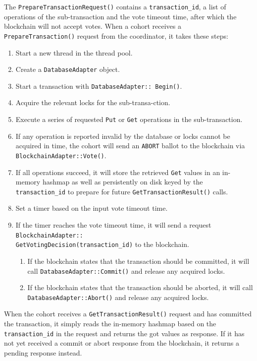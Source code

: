 \documentclass[11pt,sigplan,screen,nonacm]{acmart}
\begin{document}
The \texttt{PrepareTransactionRequest()} contains a \texttt{transaction\_id}, a list of operations of the sub-transaction and the vote timeout time, after which the blockchain will not accept votes. When a cohort receives a \texttt{PrepareTransaction()} request from the coordinator, it takes these steps: 
\begin{enumerate}
  \item Start a new thread in the thread pool.
  \item Create a \texttt{DatabaseAdapter} object.
  \item Start a transaction with \texttt{DatabaseAdapter:: Begin()}.
  \item Acquire the relevant locks for the sub-transa-ction.
  \item Execute a series of requested \texttt{Put} or \texttt{Get} operations in the sub-transaction. 
  \item If any operation is reported invalid by the database or locks cannot be acquired in time, the cohort will send an \texttt{ABORT} ballot to the blockchain via \texttt{BlockchainAdapter::Vote()}.
  \item If all operations succeed, it will store the retrieved \texttt{Get} values in an in-memory hashmap as well as persistently on disk keyed by the \texttt{transaction\_id} to prepare for future \texttt{GetTransactionResult()} calls.
  \item Set a timer based on the input vote timeout time.
  \item If the timer reaches the vote timeout time, it will send a request \texttt{BlockchainAdapter::\\GetVotingDecision(transaction\_id)} to the blockchain. 
    \begin{enumerate}
      \item If the blockchain states that the transaction should be committed, it will call \texttt{DatabaseAdapter::Commit()} and release any acquired locks.
  \item If the blockchain states that the transaction should be aborted, it will call \\ \texttt{DatabaseAdapter::Abort()} and release any acquired locks.
  \end{enumerate}
\end{enumerate}

When the cohort receives a \texttt{GetTransactionResult()} request and has committed the transaction, it simply reads the in-memory hashmap based on the \texttt{transaction\_id} in the request and returns the got values as response. If it has not yet received a commit or abort response from the blockchain, it returns a pending response instead.
\end{document}
